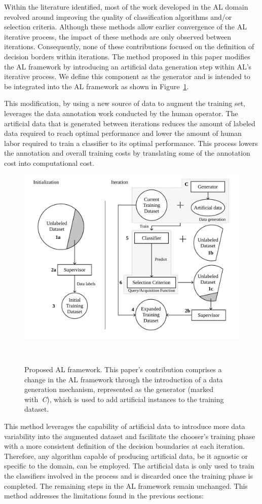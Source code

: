 Within the literature identified, most of the work developed in the AL domain
revolved around improving the quality of classification algorithms and/or
selection criteria. Although these methods allow earlier convergence of the
AL iterative process, the impact of these methods are only observed between
iterations. Consequently, none of these contributions focused on the
definition of decision borders within iterations. The method proposed in this
paper modifies the AL framework by introducing an artificial data generation
step within AL's iterative process. We define this component as the generator
and is intended to be integrated into the AL framework as shown in
Figure~\ref{fig:al_new}. 

This modification, by using a new source of data to augment the training set,
leverages the data annotation work conducted by the human operator. The
artificial data that is generated between iterations reduces the amount of
labeled data required to reach optimal performance and lower the amount of
human labor required to train a classifier to its optimal performance. This
process lowers the annotation and overall training costs by translating some
of the annotation cost into computational cost.

\begin{figure}
	\centering
	\includegraphics[width=.7\linewidth]{al_new}
    \caption[Proposed AL framework.]{%
        Proposed AL framework. This paper's contribution comprises a change in
        the AL framework through the introduction of a data generation
        mechanism, represented as the generator (marked with~\textit{C}),
        which is used to add artificial instances to the training dataset.
    }~\label{fig:al_new}
\end{figure}

This method leverages the capability of artificial data to introduce more data
variability into the augmented dataset and facilitate the chooser's training
phase with a more consistent definition of the decision boundaries at each
iteration. Therefore, any algorithm capable of producing artificial data, be
it agnostic or specific to the domain, can be employed. The artificial data is
only used to train the classifiers involved in the process and is discarded
once the training phase is completed. The remaining steps in the AL framework
remain unchanged. This method addresses the limitations found in the previous
sections:

